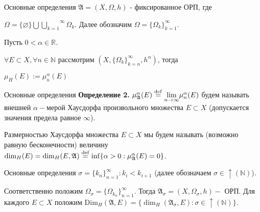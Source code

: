 \documentclass{beamer}
\begin{document}
% 
% 
\begin{frame}{Основные определения}
    $\mathfrak{A} = (X, \Omega, h)$ - фиксированное ОРП, где
    
    $\Omega = \{\varnothing\} {\bigcup }\overset{\infty}{\underset{k=1}{\bigcup}} \Omega_k$.
    Далее обозначим $\Omega = \{ \Omega_k \}_{k = 1}^\infty$.
    
    Пусть $0 < \alpha \in \mathbb{R}$.
    
    $\forall E \subset X, \forall n \in \mathbb{N}$
    рассмотрим $(X, \{ \Omega_k \}_{k = n}^\infty , h^\alpha)$, тогда
    
    $\mu_H (E) := \mu_n^\alpha (E) $
\end{frame}

% 
% 
% 
\begin{frame}{Основные определения}
    \textbf{Определение 2.} 
    $ \mu_{\mathfrak{A}}^\alpha (E) \mathrel{\stackrel{\rm def}=}
    \underset{n \to \infty}{\lim}
    \mu_n^\alpha (E)$ будем называть внешней $\alpha -$мерой Хаусдорфа произвольного множества $E \subset X$
    (допускается значения предела равное $\infty$).
    
    Размерностью Хаусдорфа множества $E \subset X$
    мы будем называть (возможно равную бесконечности) величину
    $
    \dim_H (E) =
    \dim_H(E, \mathfrak{A}) \mathrel{\stackrel{\rm def}=}
    \inf \{ \alpha > 0 : \mu_{\mathfrak{A}}^\alpha (E) = 0 \}
    $.
\end{frame}

% 
% 
% 
\begin{frame}{Основные определения}
    ${ \sigma}=\{ k_n \}_{n = 1}^\infty : k_i < k_{i+1}$ (далее
    обозначаем $\sigma \in \uparrow (\mathbb{N})$).
    \newline
    
    Соответственно положим ${\Omega_\sigma}=\{ \Omega_{k_n} \}_{n=1}^\infty$. Тогда  
    ${\mathfrak{A}_\sigma}=(X, \Omega_\sigma , h) - $  ОРП. 
    Для каждого $E \subset X$
    положим 
    $\mbox{Dim}_H (\mathfrak{A}, E) =
    \{ \dim_H (\mathfrak{A}_\sigma, E) : \sigma \in \uparrow
    (\mathbb{N}) \}$.
\end{frame}
\end{document}
